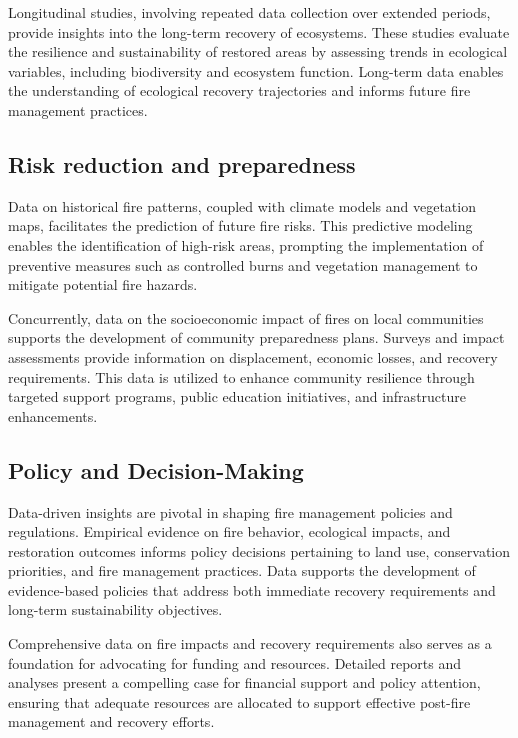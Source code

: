 \documentclass[
  12 pt,
]{Nemilov}
\begin{document}
Longitudinal studies, involving repeated data collection over extended periods, provide insights into the long-term recovery of ecosystems. These studies evaluate the resilience and sustainability of restored areas by assessing trends in ecological variables, including biodiversity and ecosystem function. Long-term data enables the understanding of ecological recovery trajectories and informs future fire management practices.

\subsection{Risk reduction and preparedness}\label{risk-reduction-and-preparedness}

Data on historical fire patterns, coupled with climate models and vegetation maps, facilitates the prediction of future fire risks. This predictive modeling enables the identification of high-risk areas, prompting the implementation of preventive measures such as controlled burns and vegetation management to mitigate potential fire hazards.

Concurrently, data on the socioeconomic impact of fires on local communities supports the development of community preparedness plans. Surveys and impact assessments provide information on displacement, economic losses, and recovery requirements. This data is utilized to enhance community resilience through targeted support programs, public education initiatives, and infrastructure enhancements.

\subsection{Policy and Decision-Making}\label{policy-and-decision-making}

Data-driven insights are pivotal in shaping fire management policies and regulations. Empirical evidence on fire behavior, ecological impacts, and restoration outcomes informs policy decisions pertaining to land use, conservation priorities, and fire management practices. Data supports the development of evidence-based policies that address both immediate recovery requirements and long-term sustainability objectives.

Comprehensive data on fire impacts and recovery requirements also serves as a foundation for advocating for funding and resources. Detailed reports and analyses present a compelling case for financial support and policy attention, ensuring that adequate resources are allocated to support effective post-fire management and recovery efforts.
\end{document}
